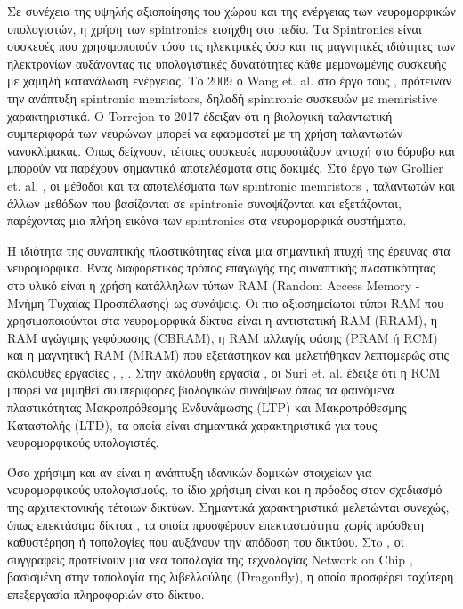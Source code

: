 \documentclass[12pt]{report}
\begin{document}
Σε συνέχεια της υψηλής αξιοποίησης του χώρου και της ενέργειας των νευρομορφικών υπολογιστών, η χρήση των \textlatin{spintronics} \cite{Utic2004} εισήχθη στο πεδίο. Τα \textlatin{Spintronics} είναι συσκευές που χρησιμοποιούν τόσο τις ηλεκτρικές όσο και τις μαγνητικές ιδιότητες των ηλεκτρονίων αυξάνοντας τις υπολογιστικές δυνατότητες κάθε μεμονωμένης συσκευής με χαμηλή κατανάλωση ενέργειας. Το 2009 ο \textlatin{Wang } \textlatin{et}. \textlatin{al}. στο έργο τους \cite{Wang2009}, πρότειναν την ανάπτυξη \textlatin{spintronic memristors}, δηλαδή \textlatin{spintronic} συσκευών με \textlatin{memristive} χαρακτηριστικά. Ο \textlatin{Torrejon}  το 2017 \cite{Torrejon2017} έδειξαν ότι η βιολογική ταλαντωτική συμπεριφορά των νευρώνων μπορεί να εφαρμοστεί με τη χρήση ταλαντωτών νανοκλίμακας. Όπως δείχνουν, τέτοιες συσκευές παρουσιάζουν αντοχή στο θόρυβο και μπορούν να παρέχουν σημαντικά αποτελέσματα στις δοκιμές. Στο έργο των \textlatin{Grollier} \textlatin{et}. \textlatin{al}. \cite{Grollier2020}, οι μέθοδοι και τα αποτελέσματα των \textlatin{spintronic memristors} , ταλαντωτών και άλλων μεθόδων που βασίζονται σε \textlatin{spintronic} συνοψίζονται και εξετάζονται, παρέχοντας μια πλήρη εικόνα των \textlatin{spintronics} στα νευρομορφικά συστήματα.

Η ιδιότητα της συναπτικής πλαστικότητας είναι μια σημαντική πτυχή της έρευνας στα νευρομορφικα. Ένας διαφορετικός τρόπος επαγωγής της συναπτικής πλαστικότητας στο υλικό είναι η χρήση κατάλληλων τύπων \textlatin{RAM} (\textlatin{Random Access Memory} - Μνήμη Τυχαίας Προσπέλασης) ως συνάψεις. Οι πιο αξιοσημείωτοι τύποι \textlatin{RAM} που χρησιμοποιούνται στα νευρομορφικά δίκτυα είναι η αντιστατική \textlatin{RAM} (\textlatin{RRAM}), η \textlatin{RAM}  αγώγιμης γεφύρωσης (\textlatin{CBRAM}), η \textlatin{RAM} αλλαγής φάσης (\textlatin{PRAM} ή \textlatin{RCM}) και η μαγνητική \textlatin{RAM} (\textlatin{MRAM}) που εξετάστηκαν και μελετήθηκαν λεπτομερώς στις ακόλουθες εργασίες \cite{Moon2019}, \cite{Cha2020}, \cite{Park2020}. Στην ακόλουθη εργασία \cite{Suri2011}, οι \textlatin{Suri} \textlatin{et}. \textlatin{al}. έδειξε ότι η \textlatin{RCM} μπορεί να μιμηθεί συμπεριφορές βιολογικών συνάψεων όπως τα φαινόμενα πλαστικότητας Μακροπρόθεσμης Ενδυνάμωσης (\textlatin{LTP}) και Μακροπρόθεσμης Καταστολής (\textlatin{LTD}), τα οποία είναι σημαντικά χαρακτηριστικά για τους νευρομορφικούς υπολογιστές.

Όσο χρήσιμη και αν είναι η ανάπτυξη ιδανικών δομικών στοιχείων για νευρομορφικούς υπολογισμούς, το ίδιο χρήσιμη είναι και η πρόοδος στον σχεδιασμό της αρχιτεκτονικής τέτοιων δικτύων. Σημαντικά χαρακτηριστικά μελετώνται συνεχώς, όπως επεκτάσιμα δίκτυα \cite{Merolla2007}, τα οποία προσφέρουν επεκτασιμότητα χωρίς πρόσθετη καθυστέρηση ή τοπολογίες που αυξάνουν την απόδοση του δικτύου. Στo \cite{Akbari2017}, οι συγγραφείς προτείνουν μια νέα τοπολογία της τεχνολογίας \textlatin{Network on Chip} , βασισμένη στην τοπολογία της λιβελλούλης (\textlatin{Dragonfly}), η οποία προσφέρει ταχύτερη επεξεργασία πληροφοριών στο δίκτυο.
\end{document}
